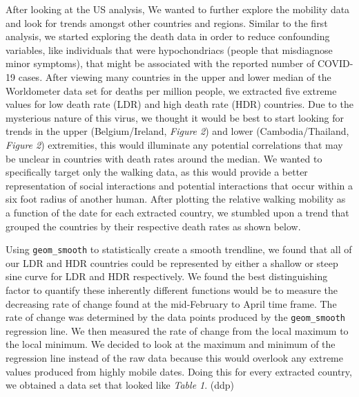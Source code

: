 \documentclass[11pt, english]{article}
\begin{document}
After looking at the US analysis, We wanted to further explore the mobility data and look for trends amongst other countries and regions. Similar to the first analysis, we started exploring the death data in order to reduce confounding variables, like individuals that were hypochondriacs (people that misdiagnose minor symptoms), that might be associated with the reported number of COVID-19 cases. After viewing many countries in the upper and lower median of the Worldometer data set for deaths per million people, we extracted five extreme values for low death rate (LDR) and high death rate (HDR) countries. Due to the mysterious nature of this virus, we thought it would be best to start looking for trends in the upper (Belgium/Ireland, \textit{Figure 2}) and lower (Cambodia/Thailand, \textit{Figure 2}) extremities, this would illuminate any potential correlations that may be unclear in countries with death rates around the median. We wanted to specifically target only the walking data, as this would provide a better representation of social interactions and potential interactions that occur within a six foot radius of another human. After plotting the relative walking mobility as a function of the date for each extracted country, we stumbled upon a trend that grouped the countries by their respective death rates as shown below.


Using \texttt{geom\_smooth} to statistically create a smooth trendline, we found that all of our LDR and HDR countries could be represented by either a shallow or steep sine curve for LDR and HDR respectively. We found the best distinguishing factor to quantify these inherently different functions would be to measure the decreasing rate of change found at the mid-February to April time frame. The rate of change was determined by the data points produced by the \texttt{geom\_smooth} regression line. We then measured the rate of change from the local maximum to the local minimum. We decided to look at the maximum and minimum of the regression line instead of the raw data because this would overlook any extreme values produced from highly mobile dates. Doing this for every extracted country, we obtained a data set that looked like \textit{Table 1}. (ddp)
\end{document}
